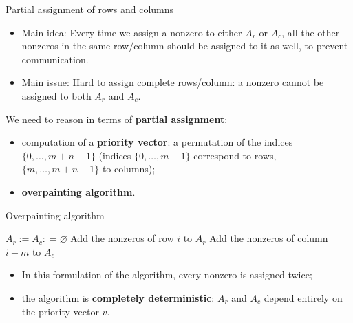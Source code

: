 \begin{frame}{Partial assignment of rows and columns}

\begin{itemize}
		\item	Main idea: Every time we assign a nonzero to either $A_r$ or $A_c$, all the other nonzeros in the same row/column should be assigned to it as well, to prevent communication.
		\item	Main issue: Hard to assign complete rows/column: a nonzero cannot be assigned to both $A_r$ and $A_c$.
\end{itemize}

We need to reason in terms of \textbf{partial assignment}:

	\begin{itemize}
		\item	computation of a \textbf{priority vector}: a permutation of the indices $\{0,\dots,m+n-1\}$ (indices $\{0,\dots,m-1\}$ correspond to rows, $\{m,\dots,m+n-1\}$ to columns);
		\item \textbf{overpainting algorithm}.
	\end{itemize}
\end{frame}


\begin{frame}{Overpainting algorithm}
\begin{algorithm}[H]
	\begin{algorithmic}
		\State $A_r := A_c: = \varnothing$
	\State Add the nonzeros of row $i$ to $A_r$
	\Else
	\State Add the nonzeros of column $i-m$ to $A_c$
	\EndIf
	\EndFor
\end{algorithmic}
\end{algorithm}

\vspace{-0.4cm}

\begin{itemize}
	\item In this formulation of the algorithm, every nonzero is assigned twice;
	\item the algorithm is \textbf{completely deterministic}: $A_r$ and $A_c$ depend entirely on the priority vector $v$.
\end{itemize}

\end{frame}

